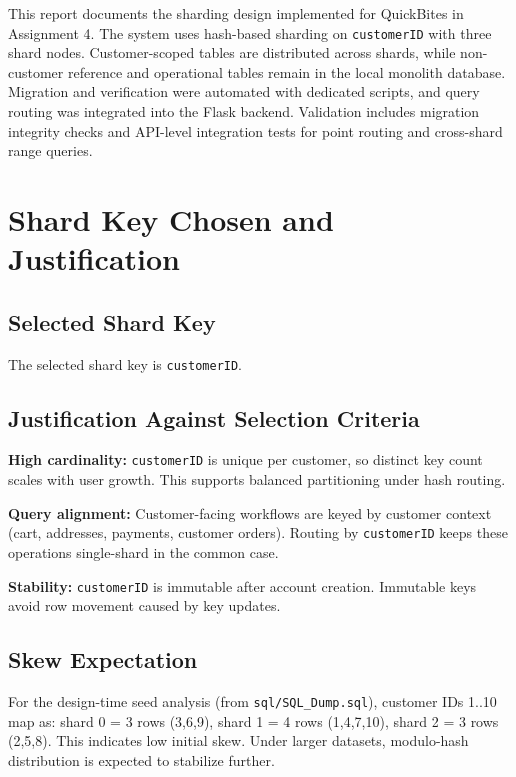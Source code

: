 \documentclass[12pt,a4paper]{article}
\begin{document}
This report documents the sharding design implemented for QuickBites in Assignment 4.
The system uses hash-based sharding on \texttt{customerID} with three shard nodes.
Customer-scoped tables are distributed across shards, while non-customer reference and
operational tables remain in the local monolith database. Migration and verification were
automated with dedicated scripts, and query routing was integrated into the Flask backend.
Validation includes migration integrity checks and API-level integration tests for point
routing and cross-shard range queries.

\section{Shard Key Chosen and Justification}

\subsection{Selected Shard Key}

The selected shard key is \texttt{customerID}.

\subsection{Justification Against Selection Criteria}

\textbf{High cardinality:}
\texttt{customerID} is unique per customer, so distinct key count scales with user growth.
This supports balanced partitioning under hash routing.

\textbf{Query alignment:}
Customer-facing workflows are keyed by customer context (cart, addresses, payments,
customer orders). Routing by \texttt{customerID} keeps these operations single-shard in
the common case.

\textbf{Stability:}
\texttt{customerID} is immutable after account creation. Immutable keys avoid row movement
caused by key updates.

\subsection{Skew Expectation}

For the design-time seed analysis (from \texttt{sql/SQL\_Dump.sql}),
customer IDs 1..10 map as: shard 0 = 3 rows (3,6,9),
shard 1 = 4 rows (1,4,7,10), shard 2 = 3 rows (2,5,8).
This indicates low initial skew. Under larger datasets,
modulo-hash distribution is expected to stabilize further.
\end{document}
